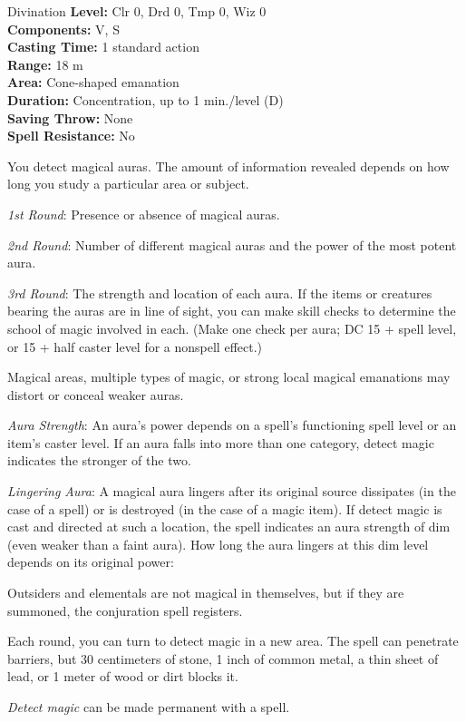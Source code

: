 {Divination}
{
	\textbf{Level:}
	Clr 0, Drd 0, Tmp 0, Wiz 0\\
	\textbf{Components:}
	V, S\\
	\textbf{Casting Time:}
	1 standard action\\
	\textbf{Range:}
	18 m\\
	\textbf{Area:}
	Cone-shaped emanation\\
	\textbf{Duration:}
	Concentration, up to 1 min./level (D)\\
	\textbf{Saving Throw:}
	None\\
	\textbf{Spell Resistance:}
	No\\
}
{
	You detect magical auras. The amount of information revealed depends on how long you study a particular area or subject.

	\textit{1st Round}:
	Presence or absence of magical auras.

	\textit{2nd Round}:
	Number of different magical auras and the power of the most potent aura.

	\textit{3rd Round}:
	The strength and location of each aura. If the items or creatures bearing the auras are in line of sight, you can make  skill checks to determine the school of magic involved in each. (Make one check per aura; DC 15 + spell level, or 15 + half caster level for a nonspell effect.)

	Magical areas, multiple types of magic, or strong local magical emanations may distort or conceal weaker auras.

	\textit{Aura Strength}:
	An aura's power depends on a spell's functioning spell level or an item's caster level. If an aura falls into more than one category, detect magic indicates the stronger of the two.

	\textit{Lingering Aura}:
	A magical aura lingers after its original source dissipates (in the case of a spell) or is destroyed (in the case of a magic item). If detect magic is cast and directed at such a location, the spell indicates an aura strength of dim (even weaker than a faint aura). How long the aura lingers at this dim level depends on its original power:


	Outsiders and elementals are not magical in themselves, but if they are summoned, the conjuration spell registers.

	Each round, you can turn to detect magic in a new area. The spell can penetrate barriers, but 30 centimeters of stone, 1 inch of common metal, a thin sheet of lead, or 1 meter of wood or dirt blocks it.

	\emph{Detect magic} can be made permanent with a  spell.

}
